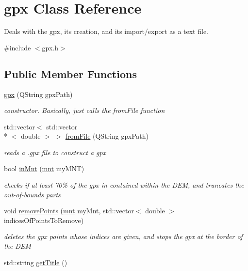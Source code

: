 \hypertarget{classgpx}{\section{gpx Class Reference}
\label{classgpx}
}


Deals with the gpx, its creation, and its import/export as a text file.  




{\ttfamily \#include $<$gpx.\+h$>$}

\subsection*{Public Member Functions}
\begin{DoxyCompactItemize}
\item 
\hyperlink{classgpx_a8e6c8f47d83e265dd23d8b79ae373f30}{gpx} (Q\+String gpx\+Path)
\begin{DoxyCompactList}\small\item\em constructor. Basically, just calls the from\+File function \end{DoxyCompactList}\item 
std\+::vector$<$ std\+::vector\\*
$<$ double $>$ $>$ \hyperlink{classgpx_a1f722deb5ee36698ecfb6a2a7dcb2487}{from\+File} (Q\+String gpx\+Path)
\begin{DoxyCompactList}\small\item\em reads a .gpx file to construct a gpx \end{DoxyCompactList}\item 
bool \hyperlink{classgpx_af71bec87483477205eed93aecacf96f1}{in\+Mnt} (\hyperlink{classmnt}{mnt} my\+M\+N\+T)
\begin{DoxyCompactList}\small\item\em checks if at least 70\% of the gpx in contained within the D\+E\+M, and truncates the out-\/of-\/bounds parts \end{DoxyCompactList}\item 
void \hyperlink{classgpx_a46cdaa73091e89f5974f83131202a76a}{remove\+Points} (\hyperlink{classmnt}{mnt} my\+Mnt, std\+::vector$<$ double $>$ indices\+Of\+Points\+To\+Remove)
\begin{DoxyCompactList}\small\item\em deletes the gpx points whose indices are given, and stops the gpx at the border of the D\+E\+M \end{DoxyCompactList}\item 
std\+::string \hyperlink{classgpx_a7c6a537bfa38ebc1ac5f5c3ddedbcefa}{get\+Title} ()

\end{DoxyCompactItemize}
